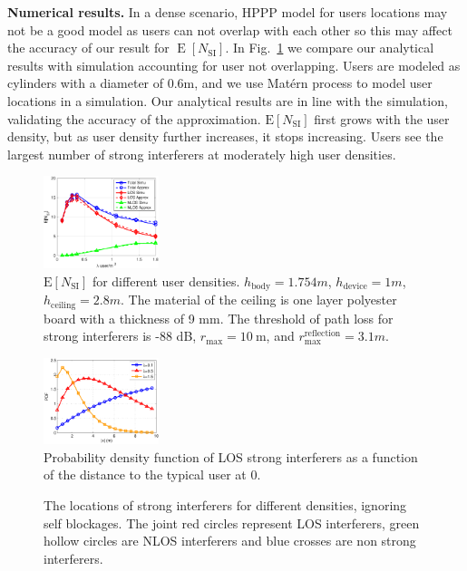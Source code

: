 \documentclass[10pt, conference, letterpaper]{IEEEtran}
\newcommand*{\Rom}[1]{\uppercase\expandafter{\romannumeral #1\relax}} %
\DeclareMathOperator*{\E}{\mathrm{E}}
\begin{document}
\textbf{Numerical results.}
In a dense scenario, HPPP model for users locations may not be a good model as users can not overlap with each other so this may affect the accuracy of our result for $\E[N_{\mathrm{SI}}]$.
In Fig.~\ref{fig:channel:en_si} we compare our analytical results with simulation accounting for user not overlapping.
Users are modeled as cylinders with a diameter of 0.6m, and we use Mat\'ern \Rom{3} process \cite{matern} to model user locations in a simulation.
Our analytical results are in line with the simulation, validating the accuracy of the approximation. 
$\mathrm{E}[N_{\mathrm{SI}}]$ first grows with the user density, but as user density further increases, it stops increasing.
Users see the largest number of strong interferers at moderately high user densities. 


\begin{figure}
	\centering
	\includegraphics[width = 0.3\textwidth]{Channel_en_si.pdf}
	\caption{$\mathrm{E}[N_{\mathrm{SI}}]$ for different user densities. $h_{\mathrm{body}} = 1.754m$,  $h_{\mathrm{device}}= 1m$, $h_{\mathrm{ceiling}}=2.8m$. 
		The material of the ceiling is one layer polyester board with a thickness of 9 mm. 
		The threshold of path loss for strong interferers is -88 dB, $r_{\max} = 10\mathrm{~m}$, and $r_{\max}^{\mathrm{reflection}} = 3.1m$.}
	\label{fig:channel:en_si}
\end{figure}


\begin{figure}
	\centering
	\includegraphics[width = 0.3\textwidth]{Channel_si_pdf.pdf}
	\caption{Probability density function of LOS strong interferers as a function of the distance to the typical user at $0$.}
	\label{fig:Channel_si_pdf}
\end{figure}

\begin{figure}[htp]	
	\centering
	 \hfill
	 \hfill
	\caption{The locations of strong interferers for different densities, ignoring self blockages. The joint red circles represent LOS interferers, green hollow circles are NLOS interferers and blue crosses are non strong interferers.}
	\label{fig:channel:jamming}
\end{figure}
\end{document}
